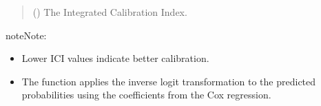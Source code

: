 \documentclass[letterpaper,10pt,english]{sphinxmanual}
\begin{document}
\begin{fulllineitems}
\begin{quote}
\begin{description}
\begin{itemize}
\end{itemize}

\sphinxAtStartPar
{} () \textendash{} The Integrated Calibration Index.

\end{description}\end{quote}

\begin{sphinxadmonition}{note}{Note:}\begin{itemize}
\item {} 
\sphinxAtStartPar
Lower ICI values indicate better calibration.

\item {} 
\sphinxAtStartPar
The function applies the inverse logit transformation to the predicted probabilities
using the coefficients from the Cox regression.

\end{itemize}
\end{sphinxadmonition}

\end{fulllineitems}

\end{document}
